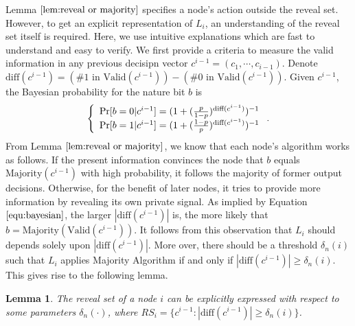 \documentclass[a4paper,UKenglish]{lipics}
\newtheorem{lem}[thm]{Lemma}
\theoremstyle{definition}
\newcommand{\diff}{\text{diff}}
\begin{document}
Lemma $\ref{lem:reveal or majority}$ specifies a node's action outside the reveal set.
However, to get an explicit representation of $L_i$, an understanding of the reveal set itself is required.
Here, we use intuitive explanations which are fast to understand and easy to verify.
We first provide a criteria to measure the valid information in any previous decisipn vector $c^{i-1} = (c_1, \dotsb, c_{i-1})$.
Denote
$
	\diff(c^{i-1}) 
	= 
	(\text{\# 1 in }\text{Valid}(c^{i-1})) - (\text{\# 0 in }\text{Valid}(c^{i-1})).
$
Given $c^{i-1}$, the Bayesian probability for the nature bit $b$ is 
\begin{equation}
\label{equ:bayesian}
\left\{
\begin{array} {l}
	\Pr[b = 0|c^{i-1}]
	= 
	(1 + ({p\over 1-p})^{\diff(c^{i-1})})^{-1}
\\
	\Pr[b = 1|c^{i-1}] 
	= 
	(1 + ({1-p\over p})^{\diff(c^{i-1})})^{-1} 
\end{array}
\right..
\end{equation}
From Lemma $\ref{lem:reveal or majority}$, we know that each node's algorithm works as follows.
If the present information convinces the node that $b$ equals $\text{Majority}(c^{i-1})$ with high probability, 
	it follows the majority of former output decisions.
Otherwise, for the benefit of later nodes, it tries to provide more information by revealing its own private signal.
As implied by Equation $\eqref{equ:bayesian}$, the larger $|\diff(c^{i-1})|$ is, the more likely that $b = \text{Majority}(\text{Valid}(c^{i-1}))$. 
It follows from this observation that $L_i$ should depends solely upon $|\diff(c^{i-1})|$.
More over, there should be a threshold $\delta_n(i)$ such that $L_i$ applies Majority Algorithm if and only if $|\diff(c^{i-1})| \ge \delta_n(i)$. 
This gives rise to the following lemma.

\begin{lem}
\label{lem:reveal set threshold}
The reveal set of a node $i$ can be explicitly expressed with respect to some parameters $\delta_n(\cdot)$, where
	$RS_i = \{ c^{i-1} :|\diff(c^{i-1})| \ge \delta_n(i) \}$.
\end{lem}
\end{document}

